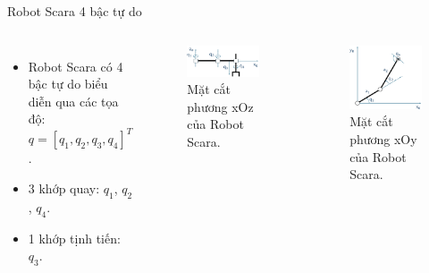 \begin{frame}{Robot Scara 4 bậc tự do}
    \begin{columns}
        \begin{itemize}
            \item Robot Scara có 4 bậc tự do biểu diễn qua các tọa độ: \( q = [q_1, q_2, q_3, q_4]^T \).
            \item 3 khớp quay: \(q_1\), \(q_2\), \(q_4\).
            \item 1 khớp tịnh tiến: \(q_3\).
        \end{itemize}
        \begin{figure}
            \centering
            \includegraphics[width=0.8\linewidth]{Figures/Scara_xOz.png}
            \caption{Mặt cắt phương xOz của Robot Scara.}
            \label{fig:Scara_xOz}
        \end{figure}
        \begin{figure}
            \centering
            \includegraphics[width=0.8\linewidth]{Figures/Scara_xOy.png}
            \caption{Mặt cắt phương xOy của Robot Scara.}
            \label{fig:Scara_xOy}
        \end{figure}
    \end{columns}
\end{frame}